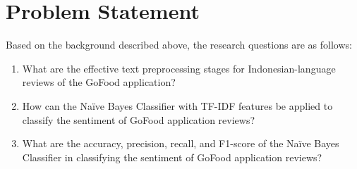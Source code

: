 \section{Problem Statement}

Based on the background described above, the research questions are as follows:

\begin{enumerate}
  \item What are the effective text preprocessing stages for Indonesian-language reviews of the GoFood application?
  \item How can the Na\"ive Bayes Classifier with TF-IDF features be applied to classify the sentiment of GoFood application reviews?
  \item What are the accuracy, precision, recall, and F1-score of the Na\"ive Bayes Classifier in classifying the sentiment of GoFood application reviews?
\end{enumerate}
